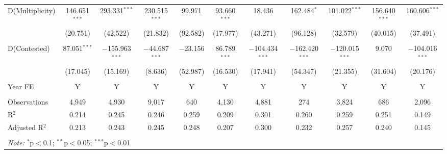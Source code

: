 \documentclass[12pt,a4paper]{article}
\begin{document}
\begin{appendices}
\begin{landscape}
\begin{table}
{\begin{tabular}{lcccccccccc}
D(Multiplicity) & 146.651$^{***}$ & 293.331$^{***}$ & 230.515$^{***}$ & 99.971 & 93.660$^{***}$ & 18.436 & 162.484$^{*}$ & 101.022$^{***}$ & 156.640$^{***}$ & 160.606$^{***}$ \\
& (20.751) & (42.522) & (21.832) & (92.582) & (17.977) & (43.271) & (96.128) & (32.579) & (40.015) & (37.491) \\
& & & & & & & & & & \\
D(Contested) & 87.051$^{***}$ & $-$155.963$^{***}$ & $-$44.687$^{***}$ & $-$23.156 & 86.789$^{***}$ & $-$104.434$^{***}$ & $-$162.420$^{***}$ & $-$120.015$^{***}$ & 9.070 & $-$104.016$^{***}$ \\
& (17.045) & (15.169) & (8.636) & (52.987) & (16.530) & (17.941) & (54.347) & (21.355) & (31.604) & (20.176) \\
\hline \\[-1.8ex]
Year FE & Y & Y & Y & Y & Y & Y & Y & Y & Y & Y \\
\hline \\[-1.8ex]
Observations & 4,949 & 4,930 & 9,017 & 640 & 4,130 & 4,881 & 274 & 3,824 & 686 & 2,096 \\
R$^{2}$ & 0.214 & 0.245 & 0.246 & 0.259 & 0.209 & 0.301 & 0.260 & 0.259 & 0.251 & 0.149 \\
Adjusted R$^{2}$ & 0.213 & 0.243 & 0.245 & 0.248 & 0.207 & 0.300 & 0.232 & 0.257 & 0.240 & 0.145 \\
\hline \\[-1.8ex]
\multicolumn{11}{l}{\textit{Note:} $^{*}$p$<$0.1; $^{**}$p$<$0.05; $^{***}$p$<$0.01} \\
\end{tabular}}
\end{table}
\end{landscape}


\end{appendices}
\end{document}
